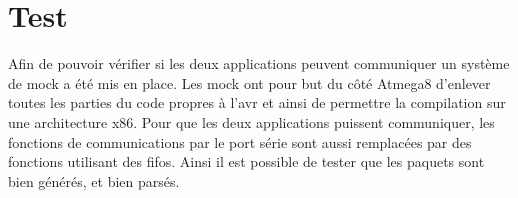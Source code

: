 \section{Test}
Afin de pouvoir vérifier si les deux applications peuvent communiquer un système de mock a été mis en place.
Les mock ont pour but du côté Atmega8 d'enlever toutes les parties du code propres à l'avr et ainsi de permettre la compilation sur une architecture x86.
Pour que les deux applications puissent communiquer, les fonctions de communications par le port série sont aussi remplacées par des fonctions utilisant des fifos.
Ainsi il est possible de tester que les paquets sont bien générés, et bien parsés.
